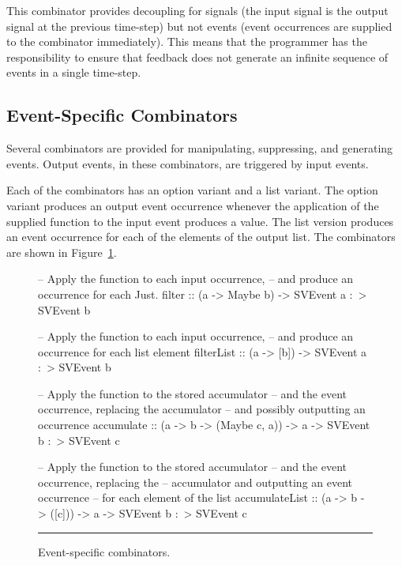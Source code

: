 This combinator provides decoupling for signals
(the input signal is the output signal at the previous time-step)
but not events (event occurrences are supplied to the combinator immediately).
This means that the programmer has the responsibility to ensure that feedback
does not generate an infinite sequence of events in a single time-step.

\subsection{Event-Specific Combinators}
\label{subsection:System_Design_and_Interface-Combinators-Event_specific_combinators}

Several combinators are provided for manipulating, suppressing, and generating events.
Output events, in these combinators, are triggered by input events.

Each of the combinators has an option variant and a list variant. The option variant
produces an output event occurrence whenever the application of the supplied function
to the input event produces a value. The list version produces an event occurrence for
each of the elements of the output list. The combinators are shown in Figure~\ref{figure:event_specific_combinators}.

\begin{figure}
\begin{code}
-- Apply the function to each input occurrence,
-- and produce an occurrence for each Just.
filter :: (a -> Maybe b) -> SVEvent a :~> SVEvent b

-- Apply the function to each input occurrence,
-- and produce an occurrence for each list element
filterList :: (a -> [b]) -> SVEvent a :~> SVEvent b

-- Apply the function to the stored accumulator
-- and the event occurrence, replacing the accumulator
-- and possibly outputting an occurrence
accumulate ::    (a -> b -> (Maybe c, a))
              -> a
              -> SVEvent b :~> SVEvent c

-- Apply the function to the stored accumulator
-- and the event occurrence, replacing the
-- accumulator and outputting an event occurrence
-- for each element of the list
accumulateList ::    (a -> b -> ([c]))
                  -> a
                  -> SVEvent b :~> SVEvent c
\end{code}
\hrule
\caption{Event-specific combinators.}
\label{figure:event_specific_combinators}
\end{figure}

